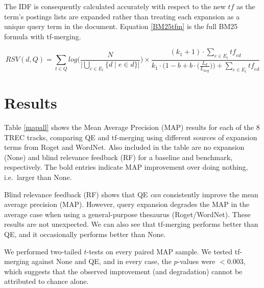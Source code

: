 The IDF is consequently calculated accurately with respect to the new $\mathit{tf}$ as the term's postings lists are expanded rather than treating each expansion as a unique query term in the document. Equation \eqref{BM25tfm} is the full BM25 formula with tf-merging.



\begin{equation} \label{BM25tfm}
	RSV(d, Q) =
	\sum_{t \in Q} log \Bigg( \frac{N}{ \bigl| \bigcup\limits_{e \in E_t} \{ d \mid e \in d \} \bigr| } \Bigg)
    \times
    \frac
    	{(k_1 + 1)   \cdot   \sum\limits_{e \in E_t} \mathit{tf}_{\!ed}}
        {k_1 \cdot \Big(1-b + b \cdot \Big(\frac{L_d}{L_{avg}}\Big) \Big) + \sum\limits_{e \in E_t} \mathit{tf}_{\!ed}}
\end{equation}



  


\section{Results}

Table \ref{mapall} shows the Mean Average Precision (MAP) results for each of the 8 TREC tracks, comparing QE and tf-merging using different sources of expansion terms from Roget and WordNet. Also included in the table are no expansion (None) and blind relevance feedback (RF) for a baseline and benchmark, respectively. The bold entries indicate MAP improvement over doing nothing, i.e.\ larger than None. 

Blind relevance feedback (RF) shows that QE \textit{can} consistently improve the mean average precision (MAP). However, query expansion degrades the MAP in the average case when using a general-purpose thesaurus (Roget/WordNet). These results are not unexpected. We can also see that tf-merging performs better than QE, and it occasionally performs better than None.

We performed two-tailed $t$-tests on every paired MAP sample. We tested tf-merging against None and QE, and in every case, the $p$-values were $< 0.003$, which suggests that the observed improvement (and degradation) cannot be attributed to chance alone.

